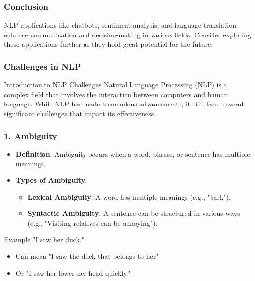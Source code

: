\documentclass[aspectratio=169]{beamer}
\begin{document}
\begin{frame}
    \frametitle{Conclusion}
    NLP applications like chatbots, sentiment analysis, and language translation enhance communication and decision-making in various fields. 
    Consider exploring these applications further as they hold great potential for the future.
\end{frame}

\begin{frame}[fragile]
    \frametitle{Challenges in NLP}
    \begin{block}{Introduction to NLP Challenges}
        Natural Language Processing (NLP) is a complex field that involves the interaction between computers and human language. While NLP has made tremendous advancements, it still faces several significant challenges that impact its effectiveness.
    \end{block}
\end{frame}

\begin{frame}[fragile]
    \frametitle{1. Ambiguity}
    \begin{itemize}
        \item \textbf{Definition}: Ambiguity occurs when a word, phrase, or sentence has multiple meanings.
        \item \textbf{Types of Ambiguity}:
        \begin{itemize}
            \item \textbf{Lexical Ambiguity}: A word has multiple meanings (e.g., "bark").
            \item \textbf{Syntactic Ambiguity}: A sentence can be structured in various ways (e.g., "Visiting relatives can be annoying").
        \end{itemize}
    \end{itemize}
    \begin{block}{Example}
        "I saw her duck." 
        \begin{itemize}
            \item Can mean "I saw the duck that belongs to her" 
            \item Or "I saw her lower her head quickly."
        \end{itemize}
    \end{block}
\end{frame}
\end{document}
